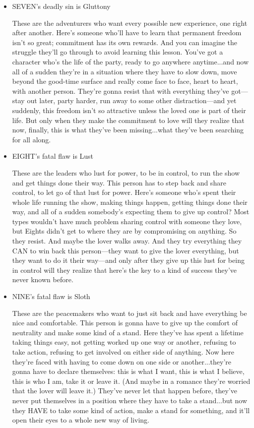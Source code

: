 \documentclass[openleft,oneside,showtrims]{memoir}
\begin{document}
\begin{itemize}
\item SEVEN's deadly sin is Gluttony
\label{sec:org5ef46d7}

These are the adventurers who want every possible new experience, one right after another. Here's someone who'll have to learn that permanent freedom isn't so great; commitment has its own rewards. And you can imagine the struggle they'll go through to avoid learning this lesson. You've got a character who's the life of the party, ready to go anywhere anytime...and now all of a sudden they're in a situation where they have to slow down, move beyond the good-time surface and really come face to face, heart to heart, with another person. They're gonna resist that with everything they've got—stay out later, party harder, run away to some other distraction—and yet suddenly, this freedom isn't so attractive unless the loved one is part of their life. But only when they make the commitment to love will they realize that now, finally, this is what they've been missing...what they've been searching for all along.

\item EIGHT's fatal flaw is Lust
\label{sec:org1605859}

These are the leaders who lust for power, to be in control, to run the show and get things done their way. This person has to step back and share control, to let go of that lust for power. Here's someone who's spent their whole life running the show, making things happen, getting things done their way, and all of a sudden somebody's expecting them to give up control? Most types wouldn't have much problem sharing control with someone they love, but Eights didn't get to where they are by compromising on anything. So they resist. And maybe the lover walks away. And they try everything they CAN to win back this person—they want to give the lover everything, but they want to do it their way—and only after they give up this lust for being in control will they realize that here's the key to a kind of success they've never known before.

\item NINE's fatal flaw is Sloth
\label{sec:org2d1ea67}

These are the peacemakers who want to just sit back and have everything be nice and comfortable. This person is gonna have to give up the comfort of neutrality and make some kind of a stand. Here they've has spent a lifetime taking things easy, not getting worked up one way or another, refusing to take action, refusing to get involved on either side of anything. Now here they're faced with having to come down on one side or another...they're gonna have to declare themselves: this is what I want, this is what I believe, this is who I am, take it or leave it. (And maybe in a romance they're worried that the lover will leave it.) They've never let that happen before, they've never put themselves in a position where they have to take a stand...but now they HAVE to take some kind of action, make a stand for something, and it'll open their eyes to a whole new way of living.


\end{itemize}
\end{document}
